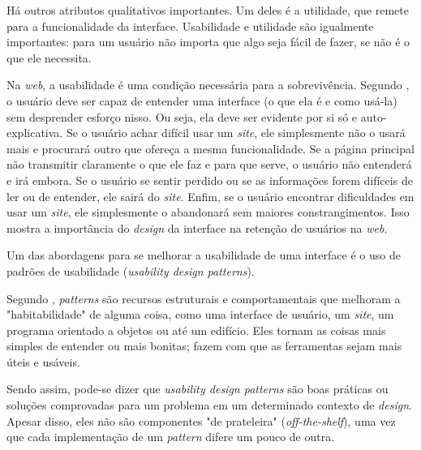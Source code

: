 Há outros atributos qualitativos importantes. Um deles é a utilidade, que remete para a funcionalidade da interface. Usabilidade e utilidade são igualmente importantes: para um usuário não importa que algo seja fácil de fazer, se não é o que ele necessita. 

Na \textit{web}, a usabilidade é uma condição necessária para a sobrevivência. Segundo , o usuário deve ser capaz de entender uma interface (o que ela é e como usá-la) sem desprender esforço nisso. Ou seja, ela deve ser evidente por si só e auto-explicativa. Se o usuário achar difícil usar um \textit{site}, ele simplesmente não o usará mais e procurará outro que ofereça a mesma funcionalidade. Se a página principal não transmitir claramente o que ele faz e para que serve, o usuário não entenderá e irá embora. Se o usuário se sentir perdido ou se as informações forem difíceis de ler ou de entender, ele sairá do \textit{site}. Enfim, se o usuário encontrar dificuldades em usar um \textit{site}, ele simplesmente o abandonará sem maiores constrangimentos. Isso mostra a importância do \textit{design} da interface na retenção de usuários na \textit{web}.

Um das abordagens para se melhorar a usabilidade de uma interface é o uso de padrões de usabilidade (\textit{usability design patterns}).

Segundo , \textit{patterns} são recursos estruturais e comportamentais que melhoram a "habitabilidade" de alguma coisa, como uma interface de usuário, um \textit{site}, um programa orientado a objetos ou até um edifício. Eles tornam as coisas mais simples de entender ou mais bonitas; fazem com que as ferramentas sejam mais úteis e usáveis.

Sendo assim, pode-se dizer que \textit{usability design patterns} são boas práticas ou soluções comprovadas para um problema em um determinado contexto de \textit{design}. Apesar disso, eles não são componentes "de prateleira" (\textit{off-the-shelf}), uma vez que cada implementação de um \textit{pattern} difere um pouco de outra. 

